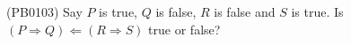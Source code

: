 (PB0103) Say $P$ is true, $Q$ is false, $R$ is false and $S$ is true. Is $(P\Rightarrow Q)\Leftarrow(R\Rightarrow S)$ true or false?

